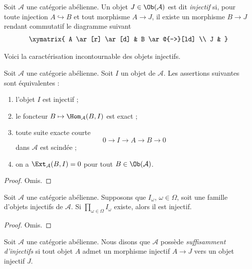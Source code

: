 \begin{definition}
\label{definition-injective}
Soit $\mathcal{A}$ une catégorie abélienne.
Un objet $J \in \Ob(\mathcal{A})$ est dit
{\it injectif} si, pour toute injection
$A \hookrightarrow B$ et tout morphisme
$A \to J$, il existe un morphisme $B \to J$ rendant
commutatif le diagramme suivant
$$
\xymatrix{
A \ar[r] \ar[d] & B \ar@{-->}[ld] \\
J &
}
$$
\end{definition}

\noindent
Voici la caractérisation incontournable des objets injectifs.

\begin{lemma}
\label{lemma-characterize-injectives}
Soit $\mathcal{A}$ une catégorie abélienne.
Soit $I$ un objet de $\mathcal{A}$.
Les assertions suivantes sont équivalentes :
\begin{enumerate}
\item l'objet $I$ est injectif ;
\item le foncteur $B \mapsto \Hom_\mathcal{A}(B, I)$
est exact ;
\item toute suite exacte courte
$$
0 \to I \to A \to B \to 0
$$
dans $\mathcal{A}$ est scindée ;
\item on a $\Ext_\mathcal{A}(B, I) = 0$ pour
tout $B \in \Ob(\mathcal{A})$.
\end{enumerate}
\end{lemma}

\begin{proof}
Omis.
\end{proof}

\begin{lemma}
\label{lemma-product-injectives}
Soit $\mathcal{A}$ une catégorie abélienne.
Supposons que $I_\omega$, $\omega \in \Omega$, soit une famille d'objets
injectifs de $\mathcal{A}$. Si $\prod_{\omega \in \Omega} I_\omega$
existe, alors il est injectif.
\end{lemma}

\begin{proof}
Omis.
\end{proof}

\begin{definition}
\label{definition-enough-injectives}
Soit $\mathcal{A}$ une catégorie abélienne.
Nous disons que $\mathcal{A}$ possède {\it suffisamment d'injectifs}
si tout objet $A$ admet un morphisme injectif
$A \to J$ vers un objet injectif $J$.
\end{definition}

